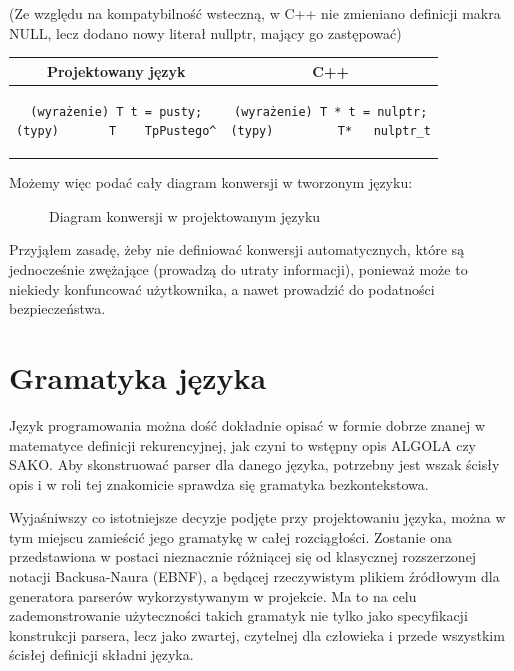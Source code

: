 (Ze względu na kompatybilność wsteczną, w C++ nie zmieniano definicji makra NULL, lecz dodano nowy literał nullptr, mający go zastępować)
\begin{center}
\begin{tabular}{|c|c|}
\hline
\textbf{Projektowany język} & \textbf{C++} \\ \hline
\begin{lstlisting}
(wyrażenie) T t = pusty;
(typy)       T    TpPustego^
\end{lstlisting}
& 
\begin{lstlisting}
(wyrażenie) T * t = nulptr;
(typy)         T*   nulptr_t
\end{lstlisting} \\\hline
\end{tabular}
\end{center}

Możemy więc podać cały diagram konwersji w tworzonym języku:

\begin{figure}[h]
    \centering
    
    \caption{Diagram konwersji w projektowanym języku}
\end{figure}

Przyjąłem zasadę, żeby nie definiować konwersji automatycznych, które są jednocześnie zwężające (prowadzą do utraty informacji), ponieważ może to niekiedy konfuncować użytkownika, a nawet prowadzić do podatności bezpieczeństwa\cite[str.~260]{Reversing}.

\section{Gramatyka języka}
\label{sect:gramatyka}
Język programowania można dość dokładnie opisać w formie dobrze znanej w matematyce definicji rekurencyjnej, jak czyni to wstępny opis ALGOLA\cite{ALGOL_PRELIMINARY_REPORT} czy SAKO\cite{SAKO}. Aby skonstruować parser dla danego języka, potrzebny jest wszak ścisły opis i w roli tej znakomicie sprawdza się gramatyka bezkontekstowa.

Wyjaśniwszy co istotniejsze decyzje podjęte przy projektowaniu języka, można w tym miejscu zamieścić jego gramatykę w całej rozciągłości.
Zostanie ona przedstawiona w postaci nieznacznie różniącej się od klasycznej rozszerzonej notacji Backusa-Naura (EBNF), a będącej rzeczywistym plikiem źródłowym dla generatora parserów wykorzystywanym w projekcie. Ma to na celu zademonstrowanie użyteczności takich gramatyk nie tylko jako specyfikacji konstrukcji parsera, lecz jako zwartej, czytelnej dla człowieka i przede wszystkim ścisłej definicji składni języka.

